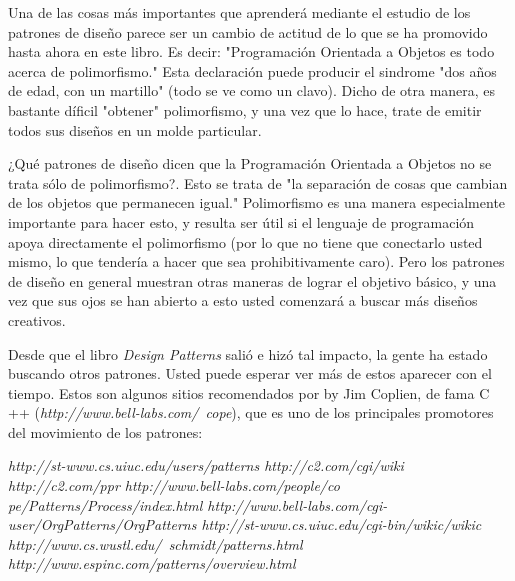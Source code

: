 Una de las cosas más importantes que aprenderá mediante el estudio de los patrones de diseño parece ser  un cambio de actitud de lo que se ha promovido hasta ahora en este libro. Es decir: "Programación Orientada a Objetos es todo acerca de polimorfismo." Esta declaración puede producir el sindrome "dos años de edad, con un martillo"  (todo se ve como un clavo). Dicho de otra manera, es bastante díficil "obtener" polimorfismo, y una vez que lo hace, trate de emitir  %
todos sus diseños en un molde particular.\newline

¿Qué patrones de diseño dicen que la Programación Orientada a Objetos no se trata sólo de polimorfismo?. Esto se trata de "la separación de cosas que cambian de los objetos que permanecen igual." Polimorfismo es una manera especialmente importante para hacer esto, y resulta ser útil si el lenguaje de programación apoya directamente el polimorfismo (por lo que no tiene que conectarlo usted mismo, lo que tendería a hacer que sea prohibitivamente caro). Pero los patrones de diseño en general muestran otras maneras de lograr el objetivo básico, y una vez que sus ojos se han abierto a esto usted comenzará a buscar más diseños creativos.\newline

Desde que el libro \textit{Design Patterns} salió e hizó tal impacto, la gente ha estado buscando otros patrones. Usted puede esperar ver más de estos aparecer con el tiempo. Estos son algunos sitios recomendados por by Jim Coplien, de fama C ++ (\textit{http://www.bell-labs.com/~cope}), que es uno de los principales promotores del movimiento de los patrones:      \newline

\textit{http://st-www.cs.uiuc.edu/users/patterns \newline
http://c2.com/cgi/wiki \newline
http://c2.com/ppr  \newline
http://www.bell-labs.com/people/co \newline
pe/Patterns/Process/index.html  \newline
http://www.bell-labs.com/cgi-user/OrgPatterns/OrgPatterns  \newline
http://st-www.cs.uiuc.edu/cgi-bin/wikic/wikic  \newline
http://www.cs.wustl.edu/~schmidt/patterns.html  \newline
http://www.espinc.com/patterns/overview.html } \newline

